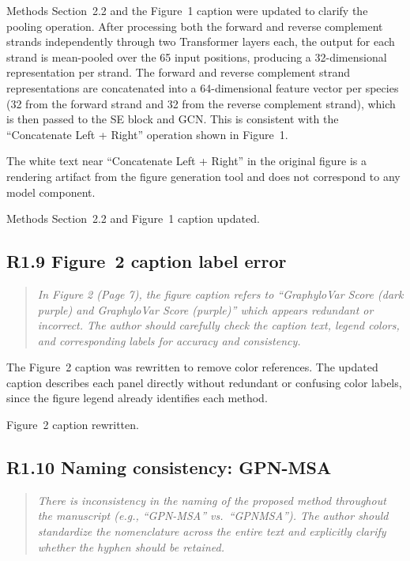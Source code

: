 \documentclass[11pt]{article}
\begin{document}
Methods Section~2.2 and the Figure~1 caption were updated to clarify the
pooling operation.  After processing both the forward and reverse complement
strands independently through two Transformer layers each, the output for
each strand is mean-pooled over the 65 input positions, producing a
32-dimensional representation per strand.  The forward and reverse
complement strand representations are concatenated into a 64-dimensional
feature vector per species (32 from the forward strand and 32 from the
reverse complement strand), which is then passed to the SE block and GCN.
This is consistent with the ``Concatenate Left + Right'' operation shown
in Figure~1.

The white text near ``Concatenate Left + Right'' in the original figure is
a rendering artifact from the figure generation tool and does not correspond
to any model component.

Methods Section~2.2 and Figure~1 caption updated.

\bigskip

\subsection*{R1.9 Figure~2 caption label error}

\begin{quote}
\itshape
In Figure 2 (Page 7), the figure caption refers to ``GraphyloVar Score
(dark purple) and GraphyloVar Score (purple)'' which appears redundant
or incorrect.  The author should carefully check the caption text,
legend colors, and corresponding labels for accuracy and consistency.
\end{quote}

The Figure~2 caption was rewritten to remove color references.  The
updated caption describes each panel directly without redundant or
confusing color labels, since the figure legend already identifies each
method.

Figure~2 caption rewritten.

\bigskip

\subsection*{R1.10 Naming consistency: GPN-MSA}

\begin{quote}
\itshape
There is inconsistency in the naming of the proposed method throughout
the manuscript (e.g., ``GPN-MSA'' vs.\ ``GPNMSA'').  The author should
standardize the nomenclature across the entire text and explicitly
clarify whether the hyphen should be retained.
\end{quote}
\end{document}

